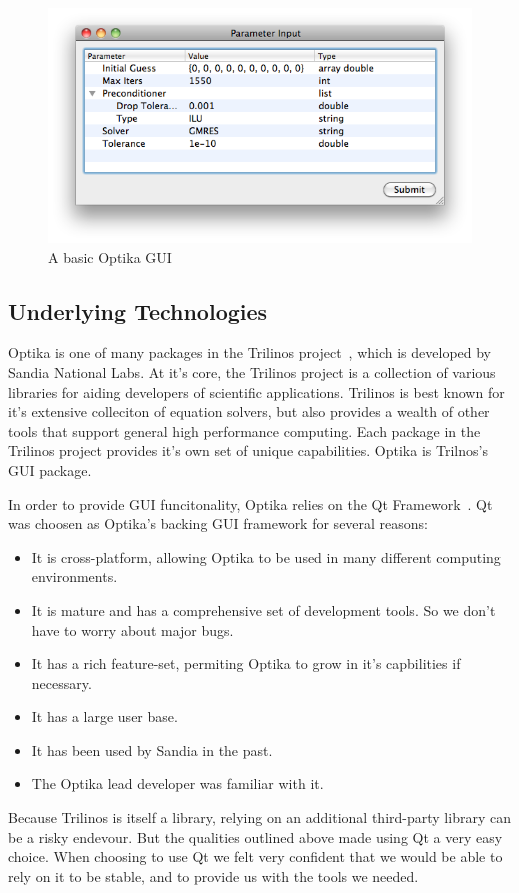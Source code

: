\begin{figure}[h]
\centering
\includegraphics[scale=0.5]{graphics/basic_example}
\caption[Basic GUI]{A basic Optika GUI}
\label{basicexample}
\end{figure} 

\subsection{Underlying Technologies}
Optika is one of many packages in the Trilinos project~\cite{trilinos}, which is developed by Sandia National Labs. At it's core, 
the Trilinos project is a collection of various
libraries for aiding developers of scientific applications. Trilinos is best known for it's extensive colleciton of equation solvers,
but also provides a wealth of other tools that support general high performance computing. Each package in the Trilinos project provides
it's own set of unique capabilities. Optika is Trilnos's GUI package.

In order to provide GUI funcitonality, Optika relies on the Qt Framework~\cite{Qt}. 
Qt was choosen as Optika's backing GUI framework for several
reasons:
	\begin{itemize}
		\item It is cross-platform, allowing Optika to be used in many different computing environments.
		\item It is mature and has a comprehensive set of development tools. So we don't have to worry about major bugs.
		\item It has a rich feature-set, permiting Optika to grow in it's capbilities if necessary.
    \item It has a large user base.
		\item It has been used by Sandia in the past.
		\item The Optika lead developer was familiar with it.
	\end{itemize}
Because Trilinos is itself a library, relying on an additional third-party library can be a risky endevour. But
the qualities outlined above made using Qt a very easy choice. When choosing to use Qt we felt very confident that we 
would be able to rely on it to be stable, and to provide us with the tools we needed.


